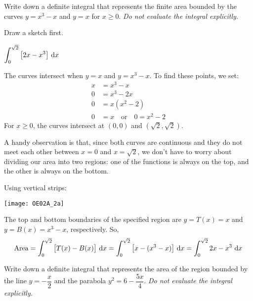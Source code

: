 \begin{solution}
\begin{enumerate}[(a)]
\end{enumerate}
\end{solution}


\begin{Mquestion}[M121 2002A]
Write down a definite integral that represents the
finite area bounded by the curves $y=x^3-x$ and
$y=x$ for $x\ge 0$.
\emph{Do not evaluate the integral explicitly.}
\end{Mquestion}

\begin{hint}
Draw a sketch first.
\end{hint}

\begin{answer}
$ \displaystyle\int_0^{\sqrt{2}}\big[2x-x^3\big]\ \dee{x}$
\end{answer}

\begin{solution}
The curves intersect when $y=x$ and $y=x^3-x$. To find these points, we set:
\begin{align*}
x&=x^3-x\\
0&=x^3-2x\\
0&=x(x^2-2)\\
0&= x \quad\mbox{or}\quad 0=x^2-2
\end{align*}
For $x\ge 0$, the curves intersect at $(0,0)$ and $(\sqrt{2},\sqrt{2})$.

A handy observation is that, since both curves are continuous and they do not meet each other between $x=0$ and $x=\sqrt{2}$, we don't have to worry about dividing our area into two regions: one of the functions is always on the top, and the other is always on the bottom.

Using vertical strips:
\begin{center}
       \texttt{[image: OE02A\_2a]}
\end{center}
The top and bottom boundaries of the specified region are $y=T(x)=x$
and $y=B(x)=x^3-x$, respectively. So,
\begin{align*}
{\rm Area} = \int_0^{\sqrt{2}}\big[T(x)-B(x)\big]\ \mathrm{d}x
= \int_0^{\sqrt{2}}\big[x-(x^3-x)\big]\ \mathrm{d}x = \int_0^{\sqrt{2}} 2x-x^3 \ \mathrm{d}x
\end{align*}

\end{solution}


\begin{question}[2000D]
Write down a definite integral that represents the
area of the region bounded by the line $y=-\dfrac{x}{2}$
and the parabola $y^2=6-\dfrac{5x}{4}$.
\emph{Do not evaluate the integral explicitly.}
\end{question}


